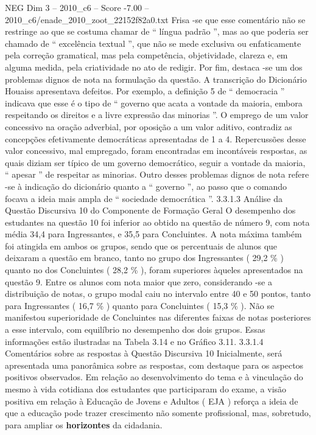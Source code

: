 \begin{textsample}{NEG Dim 3 – 2010\_c6 – Score -7.00 – 2010\_c6/enade\_2010\_zoot\_22152f82a0.txt}
Frisa -se que esse comentário não se restringe ao que se costuma chamar de “ língua padrão ”, mas ao que poderia ser chamado de “ excelência textual ”, que não se mede exclusiva ou enfaticamente pela correção gramatical, mas pela competência, objetividade, clareza e, em alguma medida, pela criatividade no ato de redigir.
Por fim, destaca -se um dos problemas dignos de nota na formulação da questão.
A transcrição do Dicionário Houaiss apresentava defeitos.
Por exemplo, a definição 5 de “ democracia ” indicava que esse é o tipo de “ governo que acata a vontade da maioria, embora respeitando os direitos e a livre expressão das minorias ”.
O emprego de um valor concessivo na oração adverbial, por oposição a um valor aditivo, contradiz as concepções efetivamente democráticas apresentadas de 1 a 4.
Repercussões desse valor concessivo, mal empregado, foram encontradas em incontáveis respostas, as quais diziam ser típico de um governo democrático, seguir a vontade da maioria, “ apesar ” de respeitar as minorias.
Outro desses problemas dignos de nota refere -se à indicação do dicionário quanto a “ governo ”, ao passo que o comando focava a ideia mais ampla de “ sociedade democrática ”. 3.3.1.3 Análise da Questão Discursiva 10 do Componente de Formação Geral O desempenho dos estudantes na questão 10 foi inferior ao obtido na questão de número 9, com nota média 34,4 para Ingressantes, e 35,5 para Concluintes.
A nota máxima também foi atingida em ambos os grupos, sendo que os percentuais de alunos que deixaram a questão em branco, tanto no grupo dos Ingressantes ( 29,2 \% ) quanto no dos Concluintes ( 28,2 \% ), foram superiores àqueles apresentados na questão 9.
Entre os alunos com nota maior que zero, considerando -se a distribuição de notas, o grupo modal caiu no intervalo entre 40 e 50 pontos, tanto para Ingressantes ( 16,7 \% ) quanto para Concluintes ( 15,3 \% ).
Não se manifestou superioridade de Concluintes nas diferentes faixas de notas posteriores a esse intervalo, com equilíbrio no desempenho dos dois grupos.
Essas informações estão ilustradas na Tabela 3.14 e no Gráfico 3.11. 3.3.1.4 Comentários sobre as respostas à Questão Discursiva 10 Inicialmente, será apresentada uma panorâmica sobre as respostas, com destaque para os aspectos positivos observados.
Em relação ao desenvolvimento do tema e à vinculação do mesmo à vida cotidiana dos estudantes que participaram do exame, a visão positiva em relação à Educação de Jovens e Adultos ( EJA ) reforça a ideia de que a educação pode trazer crescimento não somente profissional, mas, sobretudo, para ampliar os \textbf{horizontes} da cidadania.

\end{textsample}
